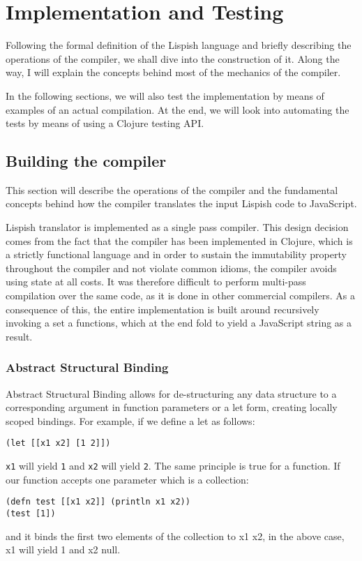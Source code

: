 \chapter{Implementation and Testing}
Following the formal definition of the Lispish language and briefly describing the operations of the compiler, we shall dive into the construction of it. Along the way, I will explain the concepts behind most of the mechanics of the compiler. 

In the following sections, we will also test the implementation by means of examples of an actual compilation. 
At the end, we will look into automating the tests by means of using a Clojure testing API.  

\section{Building the compiler}
This section will describe the operations of the compiler and the fundamental concepts behind how the compiler translates the input Lispish code to JavaScript. 

Lispish translator is implemented as a single pass compiler.
This design decision comes from the fact that the compiler has been implemented in Clojure, which is a strictly functional language and in order to sustain the immutability property throughout the compiler and not violate common idioms, the compiler avoids using state at all costs. It was therefore difficult to perform multi-pass compilation over the same code, as it is done in other commercial compilers. 
As a consequence of this, the entire implementation is built around recursively invoking a set a functions, which at the end fold to yield a JavaScript string as a result. 

\subsection{Abstract Structural Binding}
Abstract Structural Binding allows for de-structuring any data structure to a corresponding argument in function parameters or a let form, creating locally scoped bindings.
For example, if we define a let as follows:
\begin{verbatim}
(let [[x1 x2] [1 2]])
\end{verbatim}
\texttt{x1} will yield \texttt{1} and \texttt{x2} will yield \texttt{2}.
The same principle is true for a function.
If our function accepts one parameter which is a collection:

\begin{verbatim}
(defn test [[x1 x2]] (println x1 x2))
(test [1])
\end{verbatim}
and it binds the first two elements of the collection to x1 x2, in the above case, x1 will yield 1 and x2 null.

